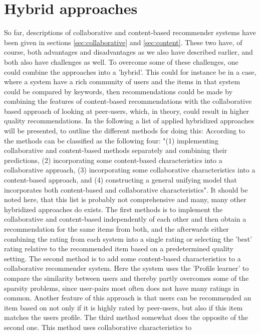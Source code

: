 \section{Hybrid approaches}
So far, descriptions of collaborative and content-based recommender systems have been given in sections \ref{sec:collaborative} and \ref{sec:content}. These two have, of course, both advantages and disadvantages as we also have described earlier, and both also have challenges as well. To overcome some of these challenges, one could combine the approaches into a 'hybrid'. This could for instance be in a case, where a system have a rich community of users and the items in that system could be compared by keywords, then recommendations could be made by combining the features of content-based recommendations with the collaborative based approach of looking at peer-users, which, in theory, could result in higher quality recommendations.
In the following a list of applied hybridized approaches will be presented, to outline the different methods for doing this:
According to \citep[p. 20]{TowardsTheNextGenerationOfRs} the methods can be classified as the following four: "(1) implementing collaborative and content-based methods separately and combining their predictions, (2) incorporating some content-based characteristics into a collaborative approach, (3) incorporating some collaborative characteristics into a content-based approach, and (4) constructing a general unifying model that incorporates both content-based and collaborative characteristics". It should be noted here, that this list is probably not comprehensive and many, many other hybridized approaches do exists. 
The first methods is to implement the collaborative and content-based independently of each other and then obtain a recommendation for the same items from both, and the afterwards either combining the rating from each system into a single rating or selecting the 'best' rating relative to the recommended item based on a predetermined quality setting. 
The second method is to add some content-based characteristics to a collaborative recommender system. Here the system uses the 'Profile learner' to compare the similarity between users and thereby partly overcomes some of the sparsity problems, since user-pairs most often does not have many ratings in common. Another feature of this approach is that users can be recommended an item based on not only if it is highly rated by peer-users, but also if this item matches the users profile. 
The third method somewhat does the opposite of the second one. This method uses collaborative characteristics to  
